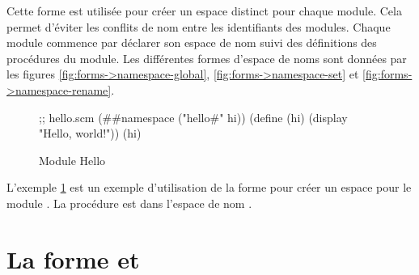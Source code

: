 





Cette forme est utilisée pour créer un espace distinct pour chaque module.
Cela permet d'éviter les conflits de nom entre les identifiants des modules.
Chaque module commence par déclarer son espace de nom suivi des définitions
des procédures du module. Les différentes formes d'espace de noms sont données
par les figures \ref{fig:forms->namespace-global}, \ref{fig:forms->namespace-set}
et \ref{fig:forms->namespace-rename}.
\\
\begin{figure}[ht]
  \centering
\begin{mplisting}{0.6}
;; hello.scm
(##namespace ("hello#" hi))
(define (hi)
  (display "Hello, world!\n"))
(hi)
\end{mplisting}
  \caption{Module Hello}
  \label{fig:namespace->hello}
\end{figure}

L'exemple \ref{fig:namespace->hello} est un exemple d'utilisation de la forme
 pour créer un espace pour le module .
La procédure  est dans l'espace de nom .

\section{La forme  et }

